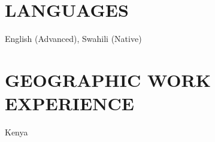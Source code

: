 \documentclass{res}
\begin{document}
\begin{resume}
	\section{LANGUAGES}
	\begin{itemize} \itemsep -2pt
		      \vspace{8pt}
		      English (Advanced), Swahili (Native)
	\end{itemize}

	\section{GEOGRAPHIC WORK EXPERIENCE}
	\begin{itemize} \itemsep -2pt
		      \vspace{8pt}
		      Kenya
	\end{itemize}

\end{resume}
\end{document}
